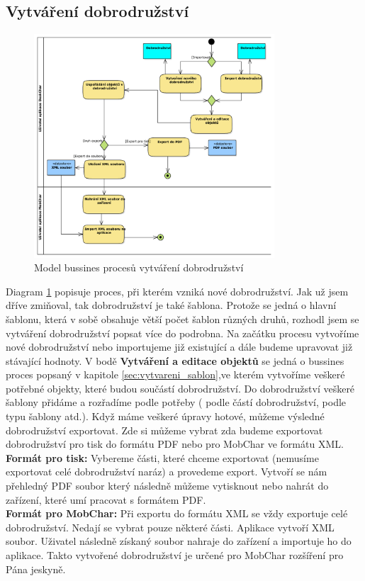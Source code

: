 \documentclass[thesis=B,czech]{resources/FITthesis}[2012/06/26]
\begin{document}
\subsection{Vytváření dobrodružství}
\begin{figure}\centering
	\includegraphics[width=0.8\textwidth]{images/business_dobrodruzstvi}
	\caption[Business proces vytváření dobrodružství]{Model bussines procesů vytváření dobrodružství}\label{fig:bp_dobrodruzsvi}
\end{figure}
Diagram \ref{fig:bp_dobrodruzsvi} popisuje proces, při kterém vzniká nové dobrodružství. Jak už jsem dříve zmiňoval, tak dobrodružství je také šablona. Protože se jedná o hlavní šablonu, která v sobě obsahuje větší počet šablon různých druhů, rozhodl jsem se vytváření dobrodružství popsat více do podrobna. Na začátku procesu vytvoříme nové dobrodružství nebo importujeme již existující a dále budeme upravovat již stávající hodnoty. V bodě \textbf{Vytváření a editace objektů} se jedná o bussines proces popsaný v kapitole \ref{sec:vytvareni_sablon},ve kterém vytvoříme veškeré potřebné objekty, které budou součástí dobrodružství. Do dobrodružství veškeré šablony přidáme a rozřadíme podle potřeby ( podle částí dobrodružství, podle typu šablony atd.). Když máme veškeré úpravy hotové, můžeme výsledné dobrodružství exportovat. Zde si můžeme vybrat zda budeme exportovat dobrodružství pro tisk do formátu PDF nebo pro MobChar ve formátu XML.\\
\textbf{Formát pro tisk:} Vybereme části, které chceme exportovat (nemusíme exportovat celé dobrodružství naráz) a provedeme export. Vytvoří se nám přehledný PDF soubor který následně můžeme vytisknout nebo nahrát do zařízení, které umí pracovat s formátem PDF.\\
\textbf{Formát pro MobChar:} Při exportu do formátu XML se vždy exportuje celé dobrodružství. Nedají se vybrat pouze některé části. Aplikace vytvoří XML soubor. Uživatel následně získaný soubor nahraje do zařízení a importuje ho do aplikace. Takto vytvořené dobrodružství je určené pro MobChar rozšíření pro Pána jeskyně.
\end{document}
